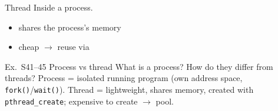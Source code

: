 \begin{definition}{Thread}
    Inside a process.
    \begin{itemize}
        \item shares the process's memory
        \item cheap $\to$ reuse via 
    \end{itemize}
\end{definition}

\multend

\begin{example2}{Ex.\ S41--45 Process vs thread}
    What is a process? How do they differ from threads?
    \tcblower
    Process = isolated running program (own address space, \texttt{fork()}/\texttt{wait()}). Thread = lightweight, shares memory, created with \texttt{pthread\_create}; expensive to create $\to$ pool.
\end{example2}
